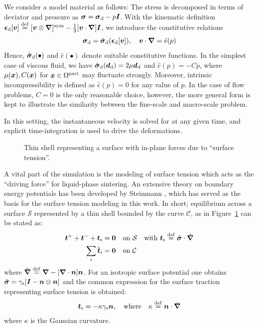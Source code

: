 \documentclass[MikaelDissertation.tex]{subfiles}
\begin{document}
We consider a model material as follows: The stress is decomposed in terms of deviator and pressure as $\boldsymbol{\sigma} = \boldsymbol{\sigma}_{\mathrm{d}} - p\boldsymbol{I}$.
With the kinematic definition $\boldsymbol{\epsilon}_{\mathrm{d}}[\boldsymbol{v}]\overset{\mathrm{def}}{=}[\boldsymbol{v}\mathbin{\otimes}\boldsymbol{\nabla}]^{\mathrm{sym}}-\frac{1}{3}[\boldsymbol{v}\cdot\boldsymbol{\nabla}]\boldsymbol{I}$, we introduce the constitutive relations
\begin{equation}
    \boldsymbol{\sigma}_{\mathrm{d}} = \hat{\boldsymbol{\sigma}}_{\mathrm{d}}(\boldsymbol{\epsilon}_{\mathrm{d}}[\boldsymbol{v}]), \quad
    \boldsymbol{v}\cdot\boldsymbol{\nabla} = \hat{e}(p)
\label{eq201}
\end{equation}
Hence, $\hat{\boldsymbol{\sigma}}_{\mathrm{d}}(\bullet)$ and $\hat{e}(\bullet)$ denote suitable constitutive functions.
In the simplest case of viscous fluid, we have $\hat{\boldsymbol{\sigma}}_{\mathrm{d}}(\boldsymbol{d}_{\mathrm{d}})=2\mu\boldsymbol{d}_{\mathrm{d}}$ and $\hat{e}(p)=- C p$, where $\mu(\boldsymbol{x}), C(\boldsymbol{x})$ for $\boldsymbol{x}\in\Omega^{\mathrm{part}}$ may fluctuate strongly.
Moreover, intrinsic incompressibility is defined as $\hat{e}(p)=0$ for any value of $p$.
In the case of flow problems, $C = 0$ is the only reasonable choice, however, the more general form is kept to illustrate the similarity between the fine-scale and macro-scale problem.

In this setting, the instantaneous velocity is solved for at any given time, and explicit time-integration is used to drive the deformations.

\begin{figure}[th!]
    \centering
    
    \caption{Thin shell representing a surface with in-plane forces due to ``surface tension''.}
    \label{fig:surfacestress}
\end{figure}
A vital part of the simulation is the modeling of surface tension which acts as the ``driving force'' for liquid-phase sintering.
An extensive theory on boundary energy potentials has been developed by Steinmann \cite{steinmann_boundary_2008}, which has served as the basis for the surface tension modeling in this work.
In short; equilibrium across a surface $\mathcal{S}$ represented by a thin shell bounded by the curve $\mathcal{C}$, as in Figure~\ref{fig:surfacestress} can be stated as:
\begin{align}
    \boldsymbol{t}^+ + \boldsymbol{t}^- + \boldsymbol{t}_{\mathrm{s}} &= \boldsymbol{0} \quad \text{on} \,\, \mathcal{S} \quad \text{with } \boldsymbol{t}_{\mathrm{s}} \overset{\mathrm{def}}{=} \hat{\boldsymbol{\sigma}}\cdot\hat{\boldsymbol{\nabla}}
\label{eq103KR}\\
    \sum_i \hat{\boldsymbol{t}}_i &= \boldsymbol{0} \quad \text{on} \,\, \mathcal{C}
\label{eq104KR}
\end{align}
where $\hat{\boldsymbol{\nabla}} \overset{\mathrm{def}}{=} \boldsymbol{\nabla} - [\boldsymbol{\nabla}\cdot\boldsymbol{n}]\boldsymbol{n}$.
For an isotropic surface potential one obtains $\hat{\boldsymbol{\sigma}} = \gamma_{\mathrm{s}}[\boldsymbol{I}-\boldsymbol{n}\mathbin{\otimes}\boldsymbol{n}]$ and the common expression for the surface traction representing surface tension is obtained:
\begin{align}
 \boldsymbol{t}_{\mathrm{s}} = -\kappa \gamma_{\mathrm{s}} \boldsymbol{n},\quad \text{where}\quad \kappa \overset{\mathrm{def}}{=} \boldsymbol{n}\cdot\hat{\boldsymbol{\nabla}}
\end{align}
where $\kappa$ is the Gaussian curvature.
\end{document}
